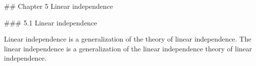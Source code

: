 

## Chapter 5 Linear independence

### 5.1 Linear independence

Linear independence is a generalization of the theory of linear independence. The linear independence is a generalization of the linear independence theory of linear independence.

